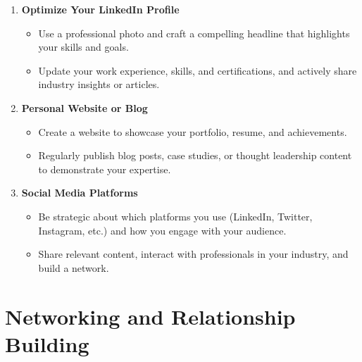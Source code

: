 \documentclass[
  letterpaper,
  DIV=11,
  numbers=noendperiod]{scrreprt}
\providecommand{\tightlist}{%
  \setlength{\itemsep}{0pt}\setlength{\parskip}{0pt}}\usepackage{longtable,booktabs,array}
\begin{document}
\begin{enumerate}
\def\labelenumi{\arabic{enumi}.}
\item
  \textbf{Optimize Your LinkedIn Profile}

  \begin{itemize}
  \tightlist
  \item
    Use a professional photo and craft a compelling headline that
    highlights your skills and goals.
  \item
    Update your work experience, skills, and certifications, and
    actively share industry insights or articles.
  \end{itemize}
\item
  \textbf{Personal Website or Blog}

  \begin{itemize}
  \tightlist
  \item
    Create a website to showcase your portfolio, resume, and
    achievements.
  \item
    Regularly publish blog posts, case studies, or thought leadership
    content to demonstrate your expertise.
  \end{itemize}
\item
  \textbf{Social Media Platforms}

  \begin{itemize}
  \tightlist
  \item
    Be strategic about which platforms you use (LinkedIn, Twitter,
    Instagram, etc.) and how you engage with your audience.
  \item
    Share relevant content, interact with professionals in your
    industry, and build a network.
  \end{itemize}
\end{enumerate}

\section{Networking and Relationship
Building}\label{networking-and-relationship-building}
\end{document}
